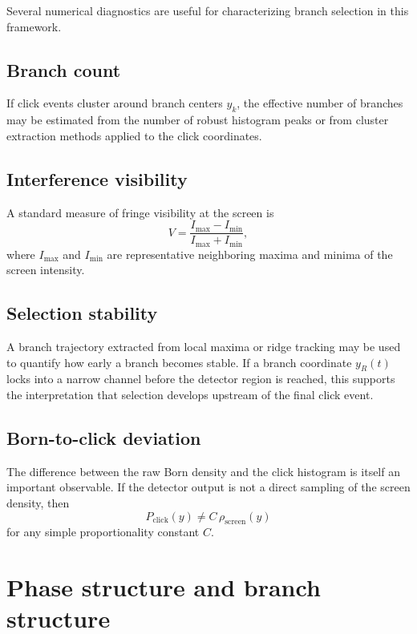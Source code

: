 \documentclass[aps,prl,reprint]{revtex4-2}
\begin{document}
Several numerical diagnostics are useful for characterizing branch selection in
this framework.

\subsection{Branch count}

If click events cluster around branch centers $y_k$, the effective number of
branches may be estimated from the number of robust histogram peaks or from
cluster extraction methods applied to the click coordinates.

\subsection{Interference visibility}

A standard measure of fringe visibility at the screen is
\begin{equation}
V=\frac{I_{\max}-I_{\min}}{I_{\max}+I_{\min}},
\end{equation}
where $I_{\max}$ and $I_{\min}$ are representative neighboring maxima and minima
of the screen intensity.

\subsection{Selection stability}

A branch trajectory extracted from local maxima or ridge tracking may be used to
quantify how early a branch becomes stable. If a branch coordinate $y_R(t)$
locks into a narrow channel before the detector region is reached, this supports
the interpretation that selection develops upstream of the final click event.

\subsection{Born-to-click deviation}

The difference between the raw Born density and the click histogram is itself an
important observable. If the detector output is not a direct sampling of the
screen density, then
\begin{equation}
P_{\mathrm{click}}(y) \neq C\,\rho_{\mathrm{screen}}(y)
\end{equation}
for any simple proportionality constant $C$.

\section{Phase structure and branch structure}
\end{document}
